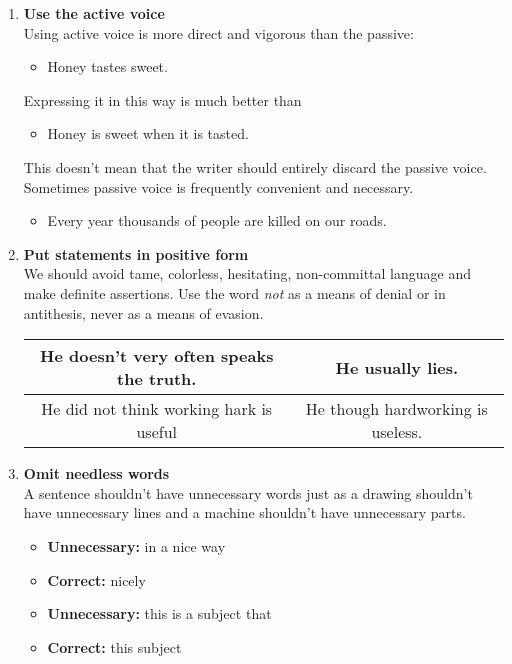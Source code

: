 \documentclass{report}
\begin{document}
\begin{enumerate}
	\item \textbf{Use the active voice}\\
	Using active voice is more direct and vigorous than the passive:
	\begin{itemize}
		\item Honey tastes sweet.
	\end{itemize}
	Expressing it in this way is much better than
	\begin{itemize}
		\item Honey is sweet when it is tasted.
	\end{itemize}
	
	This doesn't mean that the writer should entirely discard the passive voice. Sometimes passive voice is frequently convenient and necessary. 
	
	\begin{itemize}
		\item Every year thousands of people are killed on our roads.
	\end{itemize}
	
	\item \textbf{Put statements in positive form}\\
	We should avoid tame, colorless, hesitating, non-committal language and make definite assertions. Use the word \textit{not} as a means of denial or in antithesis, never as a means of evasion.
	\begin{table}[h]
		\centering
		\begin{tabular}{|c|c|}
			\hline
			He doesn't very often speaks the truth. & He usually lies. \\	
			\hline
			He did not think working hark is useful & He though hardworking is useless. \\
			\hline	
		\end{tabular}
	\end{table}
	
	\item \textbf{Omit needless words}\\
	
	A sentence shouldn't have unnecessary words just as a drawing shouldn't have unnecessary lines and a machine shouldn't have unnecessary parts.
	
	\begin{itemize}
		\item \textbf{Unnecessary: }in a nice way
		\item \textbf{Correct: }nicely
		\item \textbf{Unnecessary: }this is a subject that
		\item \textbf{Correct: }this subject
	\end{itemize}


\end{enumerate}
\end{document}
